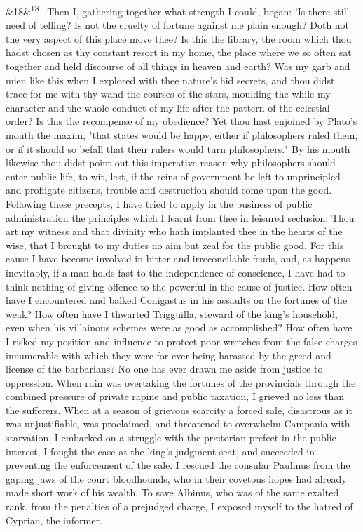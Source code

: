 \documentclass[12pt]{article}
\newcommand{\para}[1][]{\par\noindent\ifx&#1&\else\textsuperscript{\footnotesize #1}~\fi}
\begin{document}
\para[18] Then I, gathering together what strength I could, began: 'Is there still need of telling? Is not the cruelty of fortune against me plain enough? Doth not the very aspect of this place move thee? Is this the library, the room which thou hadst chosen as thy constant resort in my home, the place where we so often sat together and held discourse of all things in heaven and earth? Was my garb and mien like this when I explored with thee nature's hid secrets, and thou didst trace for me with thy wand the courses of the stars, moulding the while my character and the whole conduct of my life after the pattern of the celestial order? Is this the recompense of my obedience? Yet thou hast enjoined by Plato's mouth the maxim, "that states would be happy, either if philosophers ruled them, or if it should so befall that their rulers would turn philosophers." By his mouth likewise thou didst point out this imperative reason why philosophers should enter public life, to wit, lest, if the reins of government be left to unprincipled and profligate citizens, trouble and destruction should come upon the good. Following these precepts, I have tried to apply in the business of public administration the principles which I learnt from thee in leisured seclusion. Thou art my witness and that divinity who hath implanted thee in the hearts of the wise, that I brought to my duties no aim but zeal for the public good. For this cause I have become involved in bitter and irreconcilable feuds, and, as happens inevitably, if a man holds fast to the independence of conscience, I have had to think nothing of giving offence to the powerful in the cause of justice. How often have I encountered and balked Conigastus in his assaults on the fortunes of the weak? How often have I thwarted Trigguilla, steward of the king's household, even when his villainous schemes were as good as accomplished? How often have I risked my position and influence to protect poor wretches from the false charges innumerable with which they were for ever being harassed by the greed and license of the barbarians? No one has ever drawn me aside from justice to oppression. When ruin was overtaking the fortunes of the provincials through the combined pressure of private rapine and public taxation, I grieved no less than the sufferers. When at a season of grievous scarcity a forced sale, disastrous as it was unjustifiable, was proclaimed, and threatened to overwhelm Campania with starvation, I embarked on a struggle with the prætorian prefect in the public interest, I fought the case at the king's judgment-seat, and succeeded in preventing the enforcement of the sale. I rescued the consular Paulinus from the gaping jaws of the court bloodhounds, who in their covetous hopes had already made short work of his wealth. To save Albinus, who was of the same exalted rank, from the penalties of a prejudged charge, I exposed myself to the hatred of Cyprian, the informer.
\end{document}

